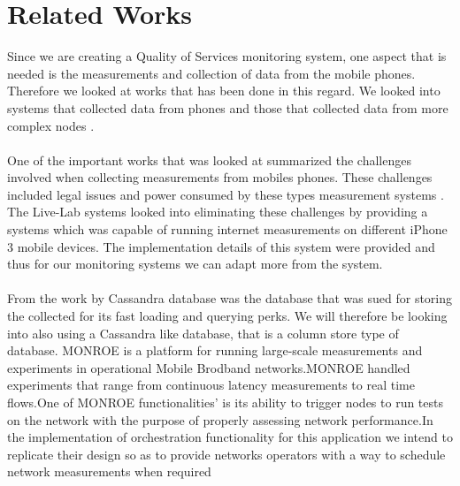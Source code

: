 \section{Related Works}
Since we are creating a Quality of Services monitoring system, one aspect that is needed is the measurements and collection of data from the mobile phones. Therefore we looked at works that has been done in this regard. We looked into systems that collected data from phones and those that collected data from more complex nodes \cite{7523537, Shepard:2011:LMW:1925019.1925023}. 
\paragraph{}
One of the important works that was looked at summarized the challenges involved when collecting measurements from mobiles phones. These challenges included legal issues and power consumed by these types measurement systems \cite{Shepard:2011:LMW:1925019.1925023}. The Live-Lab systems \cite{Shepard:2011:LMW:1925019.1925023} looked into eliminating these challenges by providing a systems which was capable of running internet measurements on different iPhone 3 mobile devices. The implementation details of this system were provided and thus for our monitoring systems we can adapt more from the system.
\paragraph{}
From the work by \cite{7523537,8255998} Cassandra database was the database that was sued for storing the collected for its fast loading and querying perks. We will therefore be looking into also using a Cassandra like database, that is a column store type of database.
MONROE is a platform for running large-scale measurements and experiments in operational Mobile Brodband networks.MONROE handled experiments that range from continuous latency measurements to real time flows.One of MONROE functionalities' is its ability to trigger nodes to run tests on the network
with the purpose of properly assessing network performance.In the implementation of orchestration functionality for this application we intend to replicate their design so as to provide networks operators with a way to schedule network measurements when required %
